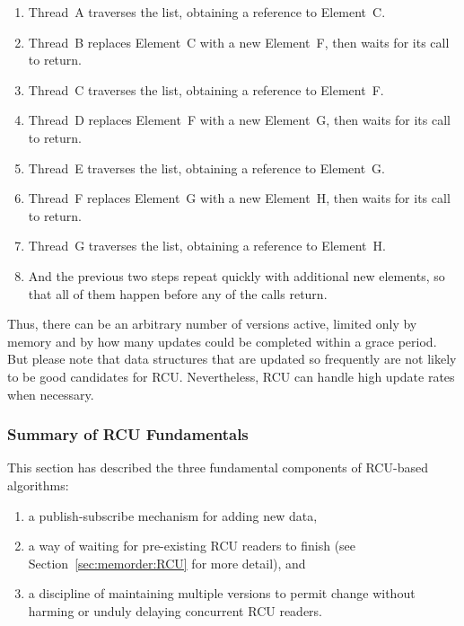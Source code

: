 {{	\begin{enumerate}
	\item	Thread~A traverses the list, obtaining a reference to
		Element~C.
	\item	Thread~B replaces Element~C with a new
		Element~F, then waits for its 
		call to return.
	\item	Thread~C traverses the list, obtaining a reference to
		Element~F.
	\item	Thread~D replaces Element~F with a new
		Element~G, then waits for its 
		call to return.
	\item	Thread~E traverses the list, obtaining a reference to
		Element~G.
	\item	Thread~F replaces Element~G with a new
		Element~H, then waits for its 
		call to return.
	\item	Thread~G traverses the list, obtaining a reference to
		Element~H.
	\item	And the previous two steps repeat quickly with additional
		new elements, so that all of them happen before any of
		the  calls return.
	\end{enumerate}

	Thus, there can be an arbitrary number of versions active,
	limited only by memory and by how many updates could be completed
	within a grace period.
	But please note that data structures that are updated so frequently
	are not likely to be good candidates for RCU\@.
	Nevertheless, RCU can handle high update rates when necessary.
}\QuickQuizEndE
}

\subsubsection{Summary of RCU Fundamentals}
\label{sec:defer:Summary of RCU Fundamentals}

This section has described the three fundamental components of RCU-based
algorithms:

\begin{enumerate}
\item	a publish-subscribe mechanism for adding new data,

\item	a way of waiting for pre-existing RCU readers to finish
	(see Section~\ref{sec:memorder:RCU} for more detail),
	and

\item	a discipline of maintaining multiple versions to permit
	change without harming or unduly delaying concurrent RCU readers.
\end{enumerate}

